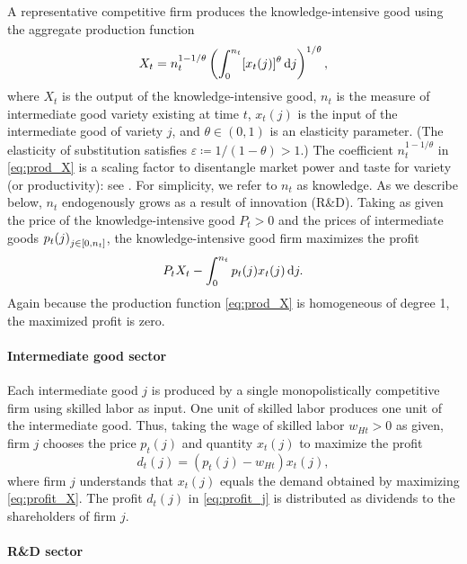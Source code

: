 \documentclass[a4paper,12pt]{article}
\numberwithin{equation}{section}
\theoremstyle{plain}
\begin{document}
A representative competitive firm produces the knowledge-intensive good using the aggregate production function
\begin{equation}
    X_t = n_t^{1-1/\theta}\left( \int_0^{n_t} [x_t(j)]^\theta \mathop{}\!\mathrm{d} j\right)^{1/\theta}, \label{eq:prod_X}
\end{equation}
where $X_t$ is the output of the knowledge-intensive good, $n_t$ is the measure of intermediate good variety existing at time $t$, $x_t(j)$ is the input of the intermediate good of variety $j$, and $\theta \in (0,1)$ is an elasticity parameter. (The elasticity of substitution satisfies $\varepsilon\coloneqq 1/(1-\theta)>1$.) The coefficient $n_t^{1-1/\theta}$ in \eqref{eq:prod_X} is a scaling factor to disentangle market power and taste for variety (or productivity): see \citet{Benassy1996,Benassy1998}. For simplicity, we refer to $n_t$ as knowledge. As we describe below, $n_t$ endogenously grows as a result of innovation (R\&D). Taking as given the price of the knowledge-intensive good $P_t>0$ and the prices of intermediate goods $\set{p_t(j)}_{j\in [0,n_t]}$, the knowledge-intensive good firm maximizes the profit
\begin{equation}
    P_tX_t-\int_0^{n_t} p_t(j)x_t(j)\mathop{}\!\mathrm{d} j. \label{eq:profit_X}
\end{equation}
Again because the production function \eqref{eq:prod_X} is homogeneous of degree 1, the maximized profit is zero.

\paragraph{Intermediate good sector}

Each intermediate good $j$ is produced by a single monopolistically competitive firm using skilled labor as input. One unit of skilled labor produces one unit of the intermediate good. Thus, taking the wage of skilled labor $w_{Ht}>0$ as given, firm $j$ chooses the price $p_t(j)$ and quantity $x_t(j)$ to maximize the profit
\begin{equation}
    d_t(j)=(p_t(j)-w_{Ht})x_t(j), \label{eq:profit_j}
\end{equation}
where firm $j$ understands that $x_t(j)$ equals the demand obtained by maximizing \eqref{eq:profit_X}. The profit $d_t(j)$ in \eqref{eq:profit_j} is distributed as dividends to the shareholders of firm $j$.

\paragraph{R\&D sector}
\end{document}
